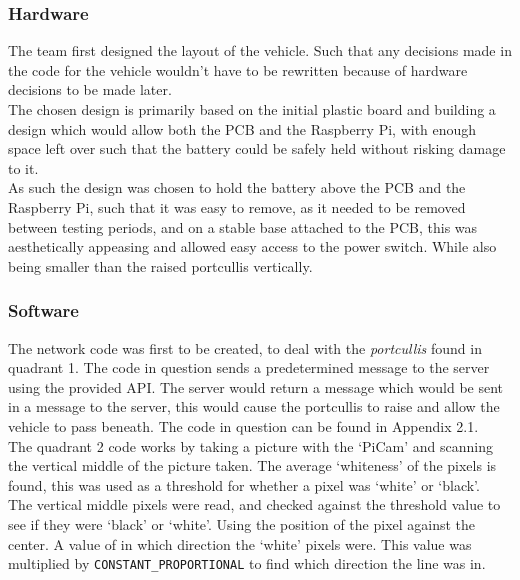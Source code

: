 \documentclass[paper=a4, fontsize=11pt]{scrartcl} %
\numberwithin{equation}{section} %
\numberwithin{figure}{section} %
\begin{document}
\subsubsection{Hardware}
The team first designed the layout of the vehicle. Such that any decisions made
in the code for the vehicle wouldn't have to be rewritten because of hardware
decisions to be made later.\\

The chosen design is primarily based on the initial plastic board and building a
design which would allow both the PCB and the Raspberry Pi, with enough space
left over such that the battery could be safely held without risking damage to
it.\\

As such the design was chosen to hold the battery above the PCB and the
Raspberry Pi, such that it was easy to remove, as it needed to be removed
between testing periods, and on a stable base attached to the PCB, this was
aesthetically appeasing and allowed easy access to the power switch. While also
being smaller than the raised portcullis vertically.\\

\subsubsection{Software}
The network code was first to be created, to deal with the \textit{portcullis}
found in quadrant 1. The code in question sends a predetermined message to the
server using the provided API. The server would return a message which would be
sent in a message to the server, this would cause the portcullis to raise and
allow the vehicle to pass beneath. The code in question can be found in Appendix
2.1.\\%

The quadrant 2 code works by taking a picture with the `PiCam' and scanning the
vertical middle of the picture taken. The average `whiteness' of the pixels is
found, this was used as a threshold for whether a pixel was `white' or
`black'.\\

The vertical middle pixels were read, and checked against the threshold value to
see if they were `black' or `white'. Using the position of the pixel against the
center. A value of in which direction the `white' pixels were. This value was
multiplied by \verb|CONSTANT_PROPORTIONAL| to find which direction the line was
in.\\
\end{document}
